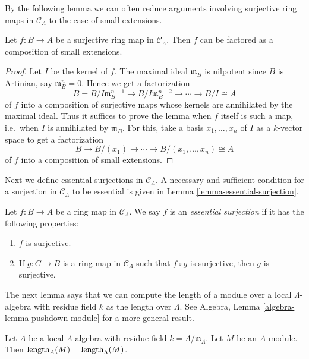 \noindent 
By the following lemma we can often reduce arguments involving surjective ring 
maps in $\mathcal C_{\Lambda}$ to the case of small extensions.
\begin{lemma}
\label{lemma-factor-small-extension}
Let $f: B \rightarrow A$ be a surjective ring map in $\mathcal C_{\Lambda}$. 
Then $f$ can be factored as a composition of small extensions.
\end{lemma}

\begin{proof}
Let $I$ be the kernel of $f$.  The maximal ideal $\mathfrak{m}_{B}$ is 
nilpotent since $B$ is Artinian, say $\mathfrak{m}_{B}^n = 0$. Hence we get a 
factorization
\[ B = B/I\mathfrak{m}_B^{n-1} \rightarrow B/I\mathfrak{m}_B^{n-2} \rightarrow 
\cdots \rightarrow B/I \cong A \]
of $f$ into a composition of surjective maps whose kernels are annihilated by 
the maximal ideal.  Thus it suffices to prove the lemma when $f$ itself is such 
a map, i.e.\ when $I$ is annihilated by $\mathfrak{m}_B$. For this, take a 
basis $x_1, \dots, x_n$ of $I$ as a $k$-vector space to get a factorization
\[ B \rightarrow B/(x_1) \rightarrow \cdots \rightarrow  B/(x_1, \dots, x_n) 
\cong  A \]
of $f$ into a composition of small extensions.
\end{proof}

\noindent
Next we define essential surjections in $\mathcal C_{\Lambda}$.  A necessary 
and sufficient condition for a surjection in $\mathcal C_{\Lambda}$ to be 
essential is given in Lemma \ref{lemma-essential-surjection}. 
\begin{definition}
\label{definition-essential-surjection}
Let $f: B \rightarrow A$ be a ring map in $\mathcal C_{\Lambda}$.  We say $f$ 
is an \emph{essential surjection} if it has the following properties:
\begin{enumerate}
\item $f$ is surjective.
\item If $g: C \rightarrow B$ is a ring map in $\mathcal C_{\Lambda}$ such that 
$f \circ g$ is surjective, then $g$ is surjective.
\end{enumerate}
\end{definition}

\noindent
The next lemma says that we can compute the length of a module over a local 
$\Lambda$-algebra with residue field $k$ as the length over $\Lambda$.  See 
Algebra, Lemma \ref{algebra-lemma-pushdown-module}
for a more general result.

\begin{lemma}
\label{lemma-length}
Let $A$ be a local $\Lambda$-algebra with residue field $k = 
\Lambda/\mathfrak{m}_{\Lambda}$.  Let $M$ be an $A$-module.  Then 
$\textnormal{length}_{A}(M) = \textnormal{length}_{\Lambda}(M)$.
\end{lemma}

